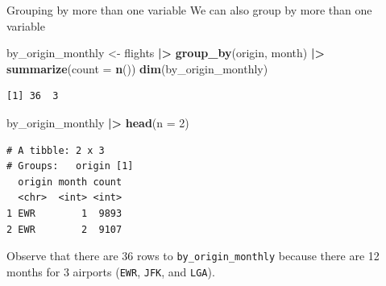 \documentclass[
  ignorenonframetext,
]{beamer}
\newenvironment{Shaded}{\begin{snugshade}}{\end{snugshade}}
\newcommand{\AttributeTok}[1]{\textcolor[rgb]{0.13,0.29,0.53}{#1}}
\newcommand{\DecValTok}[1]{\textcolor[rgb]{0.00,0.00,0.81}{#1}}
\newcommand{\FunctionTok}[1]{\textcolor[rgb]{0.13,0.29,0.53}{\textbf{#1}}}
\newcommand{\NormalTok}[1]{#1}
\newcommand{\OtherTok}[1]{\textcolor[rgb]{0.56,0.35,0.01}{#1}}
\newcommand{\SpecialCharTok}[1]{\textcolor[rgb]{0.81,0.36,0.00}{\textbf{#1}}}
\begin{document}
\begin{frame}[fragile]{Grouping by more than one variable}
\label{grouping-by-more-than-one-variable}
We can also group by more than one variable

\small

\begin{Shaded}
\begin{Highlighting}[]
\NormalTok{by\_origin\_monthly }\OtherTok{\textless{}{-}}\NormalTok{ flights }\SpecialCharTok{|\textgreater{}} 
  \FunctionTok{group\_by}\NormalTok{(origin, month) }\SpecialCharTok{|\textgreater{}} 
  \FunctionTok{summarize}\NormalTok{(}\AttributeTok{count =} \FunctionTok{n}\NormalTok{())}
\FunctionTok{dim}\NormalTok{(by\_origin\_monthly)}
\end{Highlighting}
\end{Shaded}

\begin{verbatim}
[1] 36  3
\end{verbatim}

\begin{Shaded}
\begin{Highlighting}[]
\NormalTok{by\_origin\_monthly }\SpecialCharTok{|\textgreater{}} \FunctionTok{head}\NormalTok{(}\AttributeTok{n =} \DecValTok{2}\NormalTok{)}
\end{Highlighting}
\end{Shaded}

\begin{verbatim}
# A tibble: 2 x 3
# Groups:   origin [1]
  origin month count
  <chr>  <int> <int>
1 EWR        1  9893
2 EWR        2  9107
\end{verbatim}

\normalsize

Observe that there are 36 rows to \texttt{by\_origin\_monthly} because
there are 12 months for 3 airports (\texttt{EWR}, \texttt{JFK}, and
\texttt{LGA}).
\end{frame}
\end{document}
